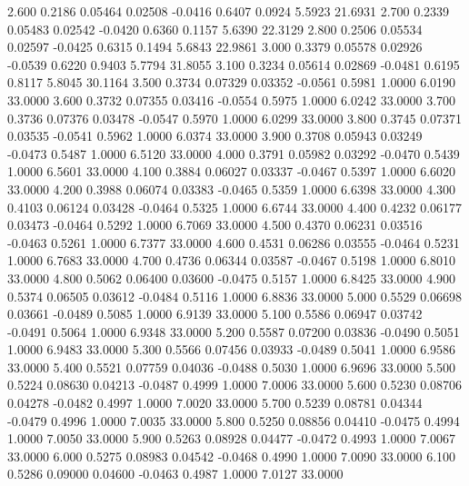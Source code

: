    2.600   0.2186   0.05464   0.02508  -0.0416   0.6407   0.0924   5.5923  21.6931
   2.700   0.2339   0.05483   0.02542  -0.0420   0.6360   0.1157   5.6390  22.3129
   2.800   0.2506   0.05534   0.02597  -0.0425   0.6315   0.1494   5.6843  22.9861
   3.000   0.3379   0.05578   0.02926  -0.0539   0.6220   0.9403   5.7794  31.8055
   3.100   0.3234   0.05614   0.02869  -0.0481   0.6195   0.8117   5.8045  30.1164
   3.500   0.3734   0.07329   0.03352  -0.0561   0.5981   1.0000   6.0190  33.0000
   3.600   0.3732   0.07355   0.03416  -0.0554   0.5975   1.0000   6.0242  33.0000
   3.700   0.3736   0.07376   0.03478  -0.0547   0.5970   1.0000   6.0299  33.0000
   3.800   0.3745   0.07371   0.03535  -0.0541   0.5962   1.0000   6.0374  33.0000
   3.900   0.3708   0.05943   0.03249  -0.0473   0.5487   1.0000   6.5120  33.0000
   4.000   0.3791   0.05982   0.03292  -0.0470   0.5439   1.0000   6.5601  33.0000
   4.100   0.3884   0.06027   0.03337  -0.0467   0.5397   1.0000   6.6020  33.0000
   4.200   0.3988   0.06074   0.03383  -0.0465   0.5359   1.0000   6.6398  33.0000
   4.300   0.4103   0.06124   0.03428  -0.0464   0.5325   1.0000   6.6744  33.0000
   4.400   0.4232   0.06177   0.03473  -0.0464   0.5292   1.0000   6.7069  33.0000
   4.500   0.4370   0.06231   0.03516  -0.0463   0.5261   1.0000   6.7377  33.0000
   4.600   0.4531   0.06286   0.03555  -0.0464   0.5231   1.0000   6.7683  33.0000
   4.700   0.4736   0.06344   0.03587  -0.0467   0.5198   1.0000   6.8010  33.0000
   4.800   0.5062   0.06400   0.03600  -0.0475   0.5157   1.0000   6.8425  33.0000
   4.900   0.5374   0.06505   0.03612  -0.0484   0.5116   1.0000   6.8836  33.0000
   5.000   0.5529   0.06698   0.03661  -0.0489   0.5085   1.0000   6.9139  33.0000
   5.100   0.5586   0.06947   0.03742  -0.0491   0.5064   1.0000   6.9348  33.0000
   5.200   0.5587   0.07200   0.03836  -0.0490   0.5051   1.0000   6.9483  33.0000
   5.300   0.5566   0.07456   0.03933  -0.0489   0.5041   1.0000   6.9586  33.0000
   5.400   0.5521   0.07759   0.04036  -0.0488   0.5030   1.0000   6.9696  33.0000
   5.500   0.5224   0.08630   0.04213  -0.0487   0.4999   1.0000   7.0006  33.0000
   5.600   0.5230   0.08706   0.04278  -0.0482   0.4997   1.0000   7.0020  33.0000
   5.700   0.5239   0.08781   0.04344  -0.0479   0.4996   1.0000   7.0035  33.0000
   5.800   0.5250   0.08856   0.04410  -0.0475   0.4994   1.0000   7.0050  33.0000
   5.900   0.5263   0.08928   0.04477  -0.0472   0.4993   1.0000   7.0067  33.0000
   6.000   0.5275   0.08983   0.04542  -0.0468   0.4990   1.0000   7.0090  33.0000
   6.100   0.5286   0.09000   0.04600  -0.0463   0.4987   1.0000   7.0127  33.0000
